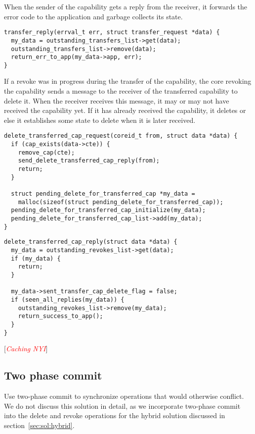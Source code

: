 \documentclass[a4paper,twoside]{report} %
\newcommand{\note}[1]{[\textcolor{red}{\textit{#1}}]}
\begin{document}
When the sender of the capability gets a reply from the receiver, it
forwards the error code to the application and garbage collects its
state.

\begin{verbatim}
transfer_reply(errval_t err, struct transfer_request *data) {
  my_data = outstanding_transfers_list->get(data);
  outstanding_transfers_list->remove(data);
  return_err_to_app(my_data->app, err);
}
\end{verbatim}

If a revoke was in progress during the transfer of the capability, the
core revoking the capability sends a message to the receiver of the
transferred capability to delete it. When the receiver receives this
message, it may or may not have received the capability yet. If it has
already received the capability, it deletes or else it establishes
some state to delete when it is later received.

\begin{verbatim}
delete_transferred_cap_request(coreid_t from, struct data *data) {
  if (cap_exists(data->cte)) {
    remove_cap(cte);
    send_delete_transferred_cap_reply(from);
    return;
  }

  struct pending_delete_for_transferred_cap *my_data =
    malloc(sizeof(struct pending_delete_for_transferred_cap));
  pending_delete_for_transferred_cap_initialize(my_data);
  pending_delete_for_transferred_cap_list->add(my_data);
}
\end{verbatim}

\begin{verbatim}
delete_transferred_cap_reply(struct data *data) {
  my_data = outstanding_revokes_list->get(data);
  if (my_data) {
    return;
  }

  my_data->sent_transfer_cap_delete_flag = false;
  if (seen_all_replies(my_data)) {
    outstanding_revokes_list->remove(my_data);
    return_success_to_app();
  }
}
\end{verbatim}

\note{Caching NYI}

\subsection{Two phase commit}
Use two-phase commit to synchronize operations that would otherwise conflict.
We do not discuss this solution in detail, as we incorporate two-phase commit
into the delete and revoke operations for the hybrid solution discussed in
section~\ref{sec:sol:hybrid}.
\end{document}

